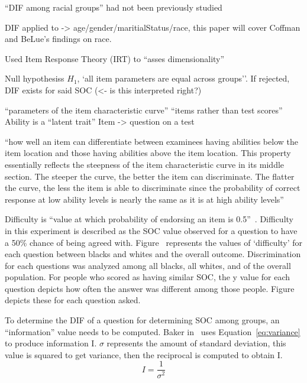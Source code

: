 \documentclass{sig-alternate}
\begin{document}
``DIF among racial groups'' had not been previously studied

DIF applied to -> age/gender/maritialStatus/race, this paper will cover Coffman and BeLue's findings on race.

Used Item Response Theory (IRT) to ``asses dimensionality''

Null hypothesiss $H_1$, `all item parameters are equal across groups''. If rejected, DIF exists for said SOC (<- is this interpreted right?)


\cite{irt:2001}
``parameters of the item characteristic curve''
``items rather than test scores''
Ability is a ``latent trait''
Item -> question on a test


``how well an item can differentiate between
examinees having abilities below the item location and those having abilities
above the item location. This property essentially reflects the steepness of the
item characteristic curve in its middle section. The steeper the curve, the better
the item can discriminate. The flatter the curve, the less the item is able to
discriminate since the probability of correct response at low ability levels is
nearly the same as it is at high ability levels''

Difficulty is ``value at which probability of endorsing an item is 0.5''~\cite{disparities:2009}.
Difficulty in this experiment is described as the SOC value observed for a question to have a 50\% chance of being agreed with. Figure~%
represents the values of `difficulty' for each question between blacks and whites and the overall outcome.
Discrimination for each questions was analyzed among all blacks, all whites, and of the overall population. For people who scored as having similar SOC, the y value for each question depicts how often the answer was different among those people.
Figure~%
depicts these for each question asked. 

To determine the DIF of a question for determining SOC among groups, an ``information'' value needs to be computed. Baker in~\cite{irt:2001} uses Equation~\ref{eq:variance} to produce information I. $\sigma$ represents the amount of standard deviation, this value is squared to get variance, then the reciprocal is computed to obtain I.
\begin{equation}
\label{eq:variance}
I =  \frac{1}{  \sigma ^{2} } 
\end{equation}
\end{document}
